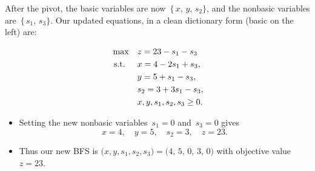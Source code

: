 \begin{tcolorbox}[colback=algopt!6, colframe=algopt, coltitle=white, fonttitle=\bfseries, sharp corners, title={\ding{52}\ Optimal: Final Dictionary}]

After the pivot, the basic variables are now
\(\,\{\,x,\,y,\,s_2\}\), 
and the nonbasic variables are 
\(\,\{\,s_1,\,s_3\}\).  
Our updated equations, in a clean dictionary form (basic on the left) are:

\[
\begin{aligned}
\max\quad 
& z = 23 - s_1 - s_3 \\
\text{ s.t. }\quad 
& x = 4 - 2s_1 + s_3, \\
& y = 5 + s_1 - s_3, \\
& s_2 = 3 + 3s_1 - s_3, \\
& x, y, s_1, s_2, s_3 \geq 0.
\end{aligned}
\]

\begin{itemize}
  \item Setting the new nonbasic variables \(\,s_1=0\) and \(\,s_3=0\) gives
  \[
  x=4, \quad y=5,\quad s_2=3,\quad z=23.
  \]
  \item Thus our new BFS is 
  \(\bigl(x,y,s_1,s_2,s_3\bigr)=\bigl(4,\,5,\,0,\,3,\,0\bigr)\) 
  with objective value \(z=23\).
\end{itemize}
\end{tcolorbox}

